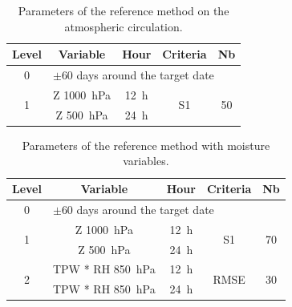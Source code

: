 \documentclass[twocol]{ametsoc}
\begin{document}
\begin{table}[htbp]
	\footnotesize
	\caption{Parameters of the reference method on the atmospheric circulation.}
	\begin{center}
		\begin{tabular}{ccccc}
			\hline \textbf{Level} & \textbf{Variable} & \textbf{Hour} & \textbf{Criteria} & \textbf{Nb} \\ 
			\hline 
			0 & \multicolumn{4}{l}{$\pm 60$ days around the target date} \\
			\hline 
			\multirow{2}{*}{1} & Z 1000~hPa & 12~h & \multirow{2}{*}{S1} & \multirow{2}{*}{50} \\
			& Z 500~hPa & 24~h & & \\ 
			\hline 
		\end{tabular} 
	\end{center}
	\label{table:params_R1}
\end{table}

\begin{table}[htbp]
	\footnotesize
	\caption{Parameters of the reference method with moisture variables.}
	\begin{center}
		\begin{tabular}{ccccc}
			\hline \textbf{Level} & \textbf{Variable} & \textbf{Hour} & \textbf{Criteria} & \textbf{Nb} \\ 
			\hline 
			0 & \multicolumn{4}{l}{$\pm 60$ days around the target date} \\
			\hline 
			\multirow{2}{*}{1} & Z 1000~hPa & 12~h & \multirow{2}{*}{S1} & \multirow{2}{*}{70} \\
			& Z 500~hPa & 24~h & & \\ 
			\hline
			\multirow{2}{*}{2} & TPW * RH 850~hPa & 12~h & \multirow{2}{*}{RMSE} & \multirow{2}{*}{30} \\
			& TPW * RH 850~hPa & 24~h & & \\ 
			\hline 
		\end{tabular} 
	\end{center}
	\label{table:params_R2}
\end{table}
\end{document}
